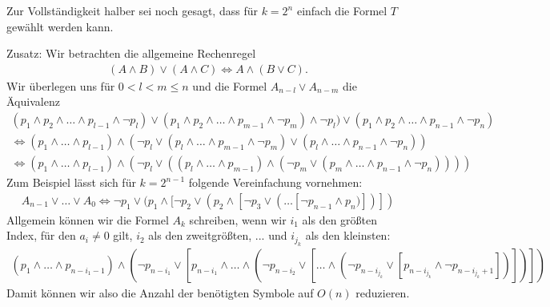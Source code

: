 \begin{solution}
Zur Vollständigkeit halber sei noch gesagt, dass für $k = 2^n$ einfach die Formel $T$ gewählt werden kann.

Zusatz: Wir betrachten die allgemeine Rechenregel
\begin{align*}
  (A \land B) \lor (A \land C) \iff A \land (B \lor C).
\end{align*}
Wir überlegen uns für $0 < l < m \leq n$ und die Formel $A_{n-l} \lor A_{n-m}$ die Äquivalenz
\begin{align*}
(p_1 \land p_2 \land \dots \land p_{l-1} \land \neg p_l) \lor (p_1 \land p_2 \land \dots \land p_{m-1} \land \neg p_m) \land \neg p_l) \lor (p_1 \land p_2 \land \dots \land p_{n-1} \land \neg p_n) \\
\Leftrightarrow (p_1 \land \dots \land p_{l-1}) \land (\neg p_l \lor (p_l \land \dots \land p_{m-1} \land \neg p_m) \lor (p_l \land \dots \land p_{n-1} \land \neg p_n)) \\
\Leftrightarrow (p_1 \land \dots \land p_{l-1}) \land (\neg p_l \lor ((p_l \land \dots \land p_{m-1}) \land (\neg p_m \lor (p_m \land \dots \land p_{n-1} \land \neg p_n))))
\end{align*}
Zum Beispiel lässt sich für $k = 2^{n-1}$ folgende Vereinfachung vornehmen:
\begin{align*}
  A_{n-1} \lor \dots \lor A_{0} \iff \neg p_1 \lor (p_1 \land [\neg p_2 \lor (p_2 \land [\neg p_3 \lor (\dots [\neg p_{n-1} \land p_n)])])
\end{align*}
Allgemein können wir die Formel $A_k$ schreiben, wenn wir $i_1$ als den größten Index, für den $a_i \neq 0$ gilt,
$i_2$ als den zweitgrößten, ... und $i_{j_k}$ als den kleinsten:
\begin{align*}
  (p_1 \land \dots \land p_{n - i_1 - 1}) \land (\neg p_{n - i_1} \lor [p_{n - i_1} \land \dots \land (\neg p_{n - i_2} \lor [\dots\land(\neg p_{n - i_{j_k}} \lor [p_{n - i_{j_k}} \land \neg p_{n - i_{j_k}+1}])])])
\end{align*}
Damit können wir also die Anzahl der benötigten Symbole auf $O(n)$ reduzieren.
\end{solution}


